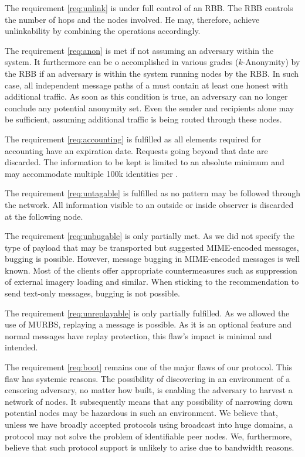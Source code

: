The requirement \ref{req:unlink} is under full control of an RBB. The RBB controls the number of hops and the nodes involved. He may, therefore, achieve unlinkability by combining the operations accordingly.

The requirement \ref{req:anon} is met if not assuming an adversary within the system. It furthermore can be o accomplished in various grades ($k$-Anonymity) by the RBB if an adversary is within the system running nodes by the RBB. In such case, all independent message paths of a \VortexMessage{} must contain at least one honest \VortexNode{} with additional traffic. As soon as this condition is true, an adversary can no longer conclude any potential anonymity set. Even the sender and recipients alone may be sufficient, assuming additional traffic is being routed through these nodes.

The requirement \ref{req:accounting} is fulfilled as all elements required for accounting have an expiration date. Requests going beyond that date are discarded. The information to be kept is limited to an absolute minimum and may accommodate multiple 100k identities per \VortexNode.

The requirement \ref{req:untagable} is fulfilled as no pattern may be followed through the network. All information visible to an outside or inside observer is discarded at the following node.

The requirement \ref{req:unbugable} is only partially met. As we did not specify the type of payload that may be transported but suggested MIME-encoded messages, bugging is possible. However, message bugging in MIME-encoded messages is well known. Most of the clients offer appropriate countermeasures such as suppression of external imagery loading and similar. When sticking to the recommendation to send text-only messages, bugging is not possible.

The requirement \ref{req:unreplayable} is only partially fulfilled. As we allowed the use of MURBS, replaying a message is possible. As it is an optional feature and normal messages have replay protection, this flaw's impact is minimal and intended.

The requirement \ref{req:boot} remains one of the major flaws of our protocol. This flaw has systemic reasons. The possibility of discovering \VortexNodes{} in an environment of a censoring adversary, no matter how built, is enabling the adversary to harvest a network of nodes. It subsequently means that any possibility of narrowing down potential nodes may be hazardous in such an environment. We believe that, unless we have broadly accepted protocols using broadcast into huge domains, a protocol may not solve the problem of identifiable peer nodes. We, furthermore, believe that such protocol support is unlikely to arise due to bandwidth reasons. 

